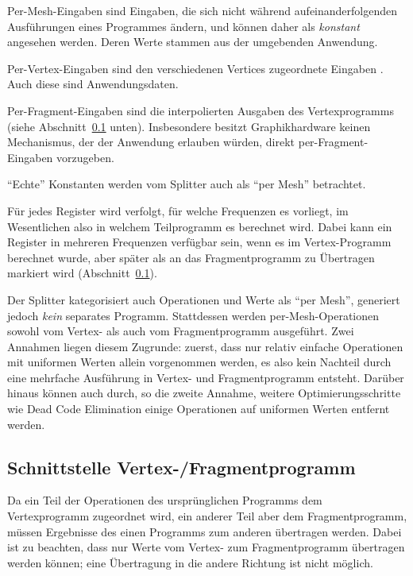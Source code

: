 \documentclass[twoside,a4paper,fleqn,12pt]{book}
\begin{document}
Per-Mesh-Eingaben sind Eingaben, die sich nicht während aufeinanderfolgenden Ausführungen eines Programmes
ändern, und können daher als \emph{konstant} angesehen werden. Deren Werte stammen aus der umgebenden Anwendung.

Per-Vertex-Eingaben sind den verschiedenen Vertices zugeordnete Eingaben . %
Auch diese sind Anwendungsdaten.

Per-Fragment-Eingaben sind die interpolierten Ausgaben des Vertexprogramms (siehe Abschnitt~\ref{schnittstelle} unten). 
Insbesondere besitzt Graphikhardware keinen Mechanismus, der der Anwendung erlauben würden, direkt per-Fragment-Eingaben
vorzugeben.

"`Echte"' Konstanten werden vom Splitter auch als "`per Mesh"' betrachtet.

Für jedes Register wird verfolgt, für welche Frequenzen es vorliegt, im Wesentlichen also in welchem Teilprogramm es berechnet wird.
Dabei kann ein Register in mehreren Frequenzen verfügbar sein, wenn es im Vertex-Programm berechnet wurde, aber später als
an das Fragmentprogramm zu Übertragen markiert wird (Abschnitt~\ref{schnittstelle}).

Der Splitter kategorisiert auch Operationen und Werte als "`per Mesh"', generiert jedoch \emph{kein} separates Programm.
Stattdessen werden per-Mesh-Operationen sowohl vom Vertex- als auch vom Fragmentprogramm ausgeführt. Zwei Annahmen
liegen diesem Zugrunde: zuerst, dass nur relativ einfache Operationen mit uniformen Werten allein vorgenommen werden, es also kein
Nachteil durch eine mehrfache Ausführung in Vertex- und Fragmentprogramm entsteht. Darüber hinaus können auch durch, so die zweite Annahme,
weitere Optimierungsschritte wie Dead Code Elimination einige Operationen auf uniformen Werten entfernt werden.


\subsection{Schnittstelle Vertex-/Fragmentprogramm}
\label{schnittstelle}

Da ein Teil der Operationen des ursprünglichen Programms dem Vertexprogramm zugeordnet wird, ein anderer Teil aber dem
Fragmentprogramm, müssen Ergebnisse des einen Programms zum anderen übertragen werden.
Dabei ist zu beachten, dass nur Werte vom Vertex- zum Fragmentprogramm übertragen werden können; %
eine Übertragung in die andere Richtung ist nicht möglich.
\end{document}
